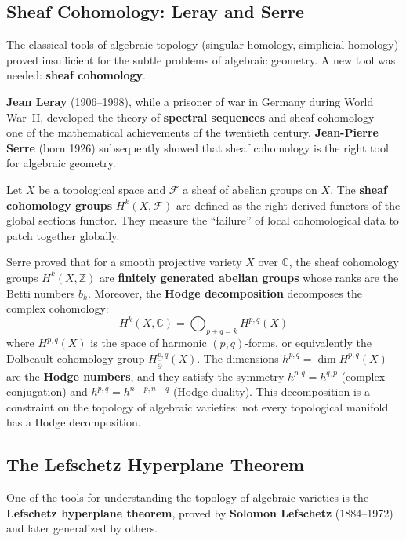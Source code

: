 \subsection{Sheaf Cohomology: Leray and Serre}

The classical tools of algebraic topology (singular homology, simplicial homology) proved insufficient for the subtle problems of algebraic geometry. A new tool was needed: \textbf{sheaf cohomology}.

\textbf{Jean Leray} (1906--1998), while a prisoner of war in Germany during World War~II, developed the theory of \textbf{spectral sequences} and sheaf cohomology---one of the mathematical achievements of the twentieth century. \textbf{Jean-Pierre Serre} (born 1926) subsequently showed that sheaf cohomology is the right tool for algebraic geometry.

\begin{definition}
Let $X$ be a topological space and $\mathcal{F}$ a sheaf of abelian groups on $X$. The \textbf{sheaf cohomology groups} $H^k(X, \mathcal{F})$ are defined as the right derived functors of the global sections functor. They measure the ``failure'' of local cohomological data to patch together globally.
\end{definition}

Serre proved that for a smooth projective variety $X$ over $\mathbb{C}$, the sheaf cohomology groups $H^k(X, \mathbb{Z})$ are \textbf{finitely generated abelian groups} whose ranks are the Betti numbers $b_k$. Moreover, the \textbf{Hodge decomposition} decomposes the complex cohomology:
\[
    H^k(X, \mathbb{C}) = \bigoplus_{p+q=k} H^{p,q}(X)
\]
where $H^{p,q}(X)$ is the space of harmonic $(p,q)$-forms, or equivalently the Dolbeault cohomology group $H^{p,q}_{\bar\partial}(X)$. The dimensions $h^{p,q} = \dim H^{p,q}(X)$ are the \textbf{Hodge numbers}, and they satisfy the symmetry $h^{p,q} = h^{q,p}$ (complex conjugation) and $h^{p,q} = h^{n-p,n-q}$ (Hodge duality). This decomposition is a constraint on the topology of algebraic varieties: not every topological manifold has a Hodge decomposition.

\subsection{The Lefschetz Hyperplane Theorem}

One of the tools for understanding the topology of algebraic varieties is the \textbf{Lefschetz hyperplane theorem}, proved by \textbf{Solomon Lefschetz} (1884--1972) and later generalized by others.

